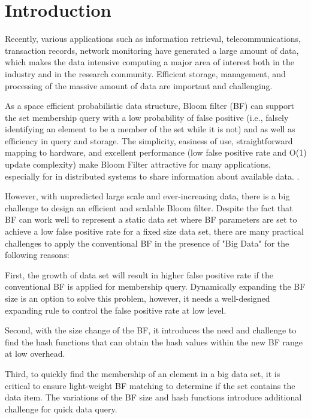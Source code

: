 \documentclass[10pt,journal,letterpaper]{IEEEtran}
\newcommand{\rev}[1]{\uwave{#1}}
\begin{document}
\section{Introduction}

Recently, various applications such as information retrieval, telecommunications, transaction records, network monitoring have generated a large amount of data, which makes the data intensive computing a major area of interest both in the industry and in the research community. Efficient storage, management, and processing of the massive amount of data are important and challenging.

As a space efficient probabilistic data structure, Bloom filter (BF) \cite{bloom1970space} can support the set membership query with a low probability of false positive (i.e., falsely identifying an element to be a member of the set while it is not) and \rev{no false negative} as well as efficiency in query and storage. The simplicity, easiness
of use, straightforward mapping to hardware, and excellent
performance (low false positive rate and O(1) update complexity) make Bloom Filter attractive for many applications,
especially for \rev{applications} in distributed systems to share
information about available data. \cite{Broder2004,tarkoma2012theory}.

However, with unpredicted large scale and ever-increasing data, there is a big challenge to design an efficient and scalable Bloom filter.
Despite the fact that BF can work well to represent a static data set where BF parameters are set to achieve a low false positive rate for a fixed size data set, there are many practical challenges to apply the conventional BF in the presence of "Big Data" for the following reasons:


First, the growth of data set will result in higher false positive rate if the conventional BF is applied for membership query. Dynamically expanding the BF size is an option to solve this problem, however, it needs a well-designed expanding rule to control the false positive rate at low level.

Second, with the size change of the BF, it introduces the need and challenge to find the hash functions that can obtain the hash values within the new BF range at low overhead.

Third, to quickly find the membership of an element in a big data set, it is critical to ensure light-weight BF matching to determine if the set contains the data item. The variations of the BF size and hash functions introduce additional challenge for quick data query.
\end{document}
